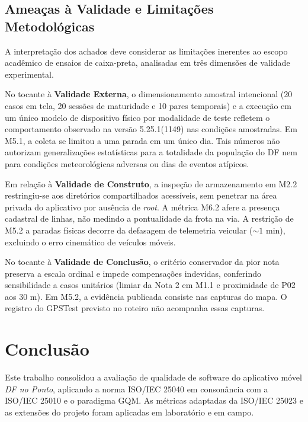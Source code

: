 \documentclass[11pt,a4paper]{article}
\begin{document}
\subsection{Ameaças à Validade e Limitações Metodológicas}
\label{sec:ameacas_validade}

A interpretação dos achados deve considerar as limitações inerentes ao escopo acadêmico de ensaios de caixa-preta, analisadas em três dimensões de validade experimental.

No tocante à \textbf{Validade Externa}, o dimensionamento amostral intencional (20 casos em tela, 20 sessões de maturidade e 10 pares temporais) e a execução em um único modelo de dispositivo físico por modalidade de teste refletem o comportamento observado na versão 5.25.1(1149) nas condições amostradas. Em M5.1, a coleta se limitou a uma parada em um único dia. Tais números não autorizam generalizações estatísticas para a totalidade da população do DF nem para condições meteorológicas adversas ou dias de eventos atípicos.

Em relação à \textbf{Validade de Construto}, a inspeção de armazenamento em M2.2 restringiu-se aos diretórios compartilhados acessíveis, sem penetrar na área privada do aplicativo por ausência de \textit{root}. A métrica M6.2 afere a presença cadastral de linhas, não medindo a pontualidade da frota na via. A restrição de M5.2 a paradas físicas decorre da defasagem de telemetria veicular ($\sim 1$ min), excluindo o erro cinemático de veículos móveis.

No tocante à \textbf{Validade de Conclusão}, o critério conservador da pior nota preserva a escala ordinal e impede compensações indevidas, conferindo sensibilidade a casos unitários (limiar da Nota 2 em M1.1 e proximidade de P02 aos 30 m). Em M5.2, a evidência publicada consiste nas capturas do mapa. O registro do GPSTest previsto no roteiro não acompanha essas capturas.

\section{Conclusão}
\label{sec:conclusao}

Este trabalho consolidou a avaliação de qualidade de software do aplicativo móvel \textit{DF no Ponto}, aplicando a norma ISO/IEC 25040 em consonância com a ISO/IEC 25010 e o paradigma GQM. As métricas adaptadas da ISO/IEC 25023 e as extensões do projeto foram aplicadas em laboratório e em campo.
\end{document}
